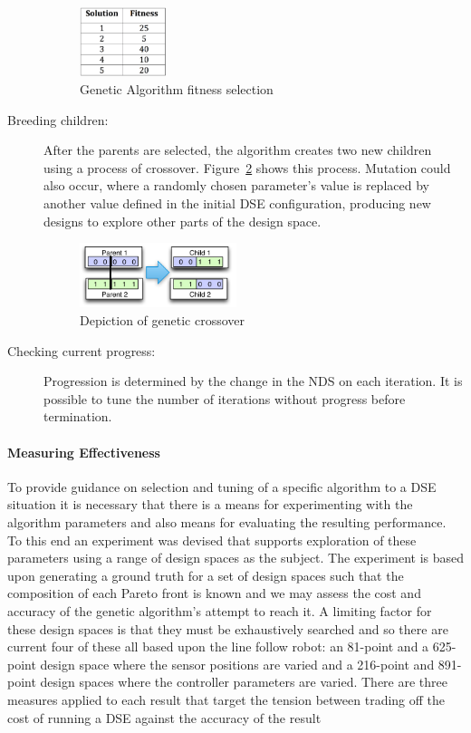 \begin{description}
\begin{figure}[htbp]
\centering
\includegraphics[width=0.25\textwidth]{figures/ga_fitness2}	
\caption{Genetic Algorithm fitness selection}
\label{fig:ga_fitness2}
\end{figure}


\item[Breeding children:] After the parents are selected, the algorithm creates two new children using a process of crossover. Figure~\ref{fig:ga_crossover} shows this process. Mutation could also occur, where a randomly chosen parameter's value is replaced by another value defined in the initial DSE configuration, producing new designs to explore other parts of the design space.

\begin{figure}[h!]
	\centering
	\includegraphics[width=0.45\textwidth]{figures/ga_breeding}
	\caption{Depiction of genetic crossover}
	\label{fig:ga_crossover}
\end{figure}

\item[Checking current progress:] Progression is determined by the change in the NDS on each iteration. It is possible to tune the number of iterations without progress before termination.

\end{description}
\paragraph{Measuring Effectiveness}
To provide guidance on selection and tuning of a specific algorithm to a DSE situation it is necessary that there is a means for experimenting with the algorithm parameters and also means for evaluating the resulting performance. To this end an experiment was devised that supports exploration of these parameters using a range of design spaces as the subject.
The experiment is based upon generating a ground truth for a set of design spaces such that the composition of each Pareto front is known and we may assess the cost and accuracy of the genetic algorithm's attempt to reach it. A limiting factor for these design spaces is that they must be exhaustively searched and so there are current four of these all based upon the line follow robot: an 81-point and a 625-point design space where the sensor positions are varied and a 216-point and 891-point design spaces where the controller parameters are varied.
There are three measures applied to each result that target the tension between trading off the cost of running a DSE against the accuracy of the result

